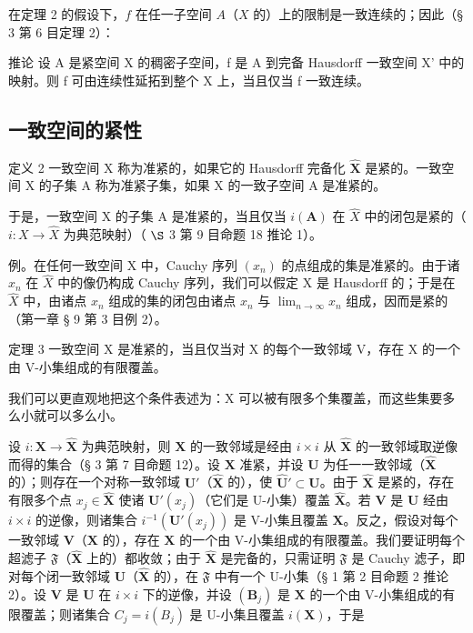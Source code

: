 在定理 2 的假设下，\(f\) 在任一子空间 \(A\)（\(X\) 的）上的限制是一致连续的；因此（§ 3 第 6 目定理 2）：

推论 设 A 是紧空间 X 的稠密子空间，f 是 A 到完备 Hausdorff 一致空间 X' 中的映射。则 f 可由连续性延拓到整个 X 上，当且仅当 f 一致连续。

\subsection{一致空间的紧性}

定义 2 一致空间 X 称为准紧的，如果它的 Hausdorff 完备化 \(\hat{\mathbf{X}}\) 是紧的。一致空间 X 的子集 A 称为准紧子集，如果 X 的一致子空间 A 是准紧的。

于是，一致空间 X 的子集 A 是准紧的，当且仅当 \(i(\mathbf{A})\) 在 \(\hat{X}\) 中的闭包是紧的（ \(i: X \rightarrow \hat{X}\) 为典范映射）（ \(\S\) 3 第 9 目命题 18 推论 1）。

例。在任何一致空间 X 中，Cauchy 序列 \((x_{n})\) 的点组成的集是准紧的。由于诸 \(x_{n}\) 在 \(\hat{X}\) 中的像仍构成 Cauchy 序列，我们可以假定 X 是 Hausdorff 的；于是在 \(\hat{X}\) 中，由诸点 \(x_{n}\) 组成的集的闭包由诸点 \(x_{n}\) 与 \(\lim_{n\to\infty}x_{n}\) 组成，因而是紧的（第一章 § 9 第 3 目例 2）。

定理 3 一致空间 X 是准紧的，当且仅当对 X 的每个一致邻域 V，存在 X 的一个由 V-小集组成的有限覆盖。

我们可以更直观地把这个条件表述为：X 可以被有限多个集覆盖，而这些集要多么小就可以多么小。

设 \(i: \mathbf{X} \to \hat{\mathbf{X}}\) 为典范映射，则 \(\mathbf{X}\) 的一致邻域是经由 \(i \times i\) 从 \(\hat{\mathbf{X}}\) 的一致邻域取逆像而得的集合（§ 3 第 7 目命题 12）。设 \(\mathbf{X}\) 准紧，并设 \(\mathbf{U}\) 为任一一致邻域（\(\hat{\mathbf{X}}\) 的）；则存在一个对称一致邻域 \(\mathbf{U}'\)（\(\hat{\mathbf{X}}\) 的），使 \(\hat{\mathbf{U}}' \subset \mathbf{U}\)。由于 \(\hat{\mathbf{X}}\) 是紧的，存在有限多个点 \(x_j \in \hat{\mathbf{X}}\) 使诸 \(\mathbf{U}'(x_j)\)（它们是 U-小集）覆盖 \(\hat{\mathbf{X}}\)。若 \(\mathbf{V}\) 是 \(\mathbf{U}\) 经由 \(i \times i\) 的逆像，则诸集合 \(i^{-1}(\mathbf{U}'(x_j))\) 是 V-小集且覆盖 \(\mathbf{X}\)。反之，假设对每个一致邻域 \(\mathbf{V}\)（\(\mathbf{X}\) 的），存在 \(\mathbf{X}\) 的一个由 V-小集组成的有限覆盖。我们要证明每个超滤子 \(\mathfrak{F}\)（\(\hat{\mathbf{X}}\) 上的）都收敛；由于 \(\hat{\mathbf{X}}\) 是完备的，只需证明 \(\mathfrak{F}\) 是 Cauchy 滤子，即对每个闭一致邻域 \(\mathbf{U}\)（\(\hat{\mathbf{X}}\) 的），在 \(\mathfrak{F}\) 中有一个 U-小集（§ 1 第 2 目命题 2 推论 2）。设 \(\mathbf{V}\) 是 \(\mathbf{U}\) 在 \(i \times i\) 下的逆像，并设 \((\mathbf{B}_j)\) 是 \(\mathbf{X}\) 的一个由 V-小集组成的有限覆盖；则诸集合 \(C_j = i(B_j)\) 是 U-小集且覆盖 \(i(\mathbf{X})\)，于是

